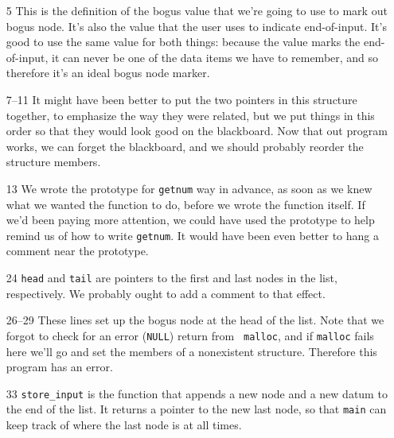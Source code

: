\begin{itemize}
\item[5] This is the definition of the bogus value that we're going to
use to mark out bogus node.  It's also the value that the user uses to
indicate end-of-input.  It's good to use the same value for both things:
because the value marks the end-of-input, it can never be one of the
data items we have to remember, and so therefore it's an ideal bogus
node marker.
\item[7--11] It might have been better to put the two pointers in this
structure together, to emphasize the way they were related, but we put
things in this order so that they would look good on the blackboard.
Now that out program works, we can forget the blackboard, and we should
probably reorder the structure members.
\item[13] We wrote the prototype for {\tt getnum} way in advance, as soon as
we knew what we wanted the function to do, before we wrote the function
itself.  If we'd been paying more attention, we could have used the
prototype to help remind us of how to write {\tt getnum}. It would have
been even better to hang a comment near the prototype.
\item[24] {\tt head} and {\tt tail} are pointers to the first and last
nodes in the list, respectively.  We probably ought to add a comment to
that effect.
\item[26--29] These lines set up the bogus node at the head of the list.
Note that we forgot to check for an error ({\tt NULL}) return from {\tt
malloc}, and if {\tt malloc} fails here we'll go and set the members of
a nonexistent structure.  Therefore this program has an error.
\item[33] {\tt store\_input} is the function that appends a new node and
a new datum to the end of the list.  It returns a pointer to the new
last node, so that {\tt main} can keep track of where the last node is
at all times.  


\end{itemize}
